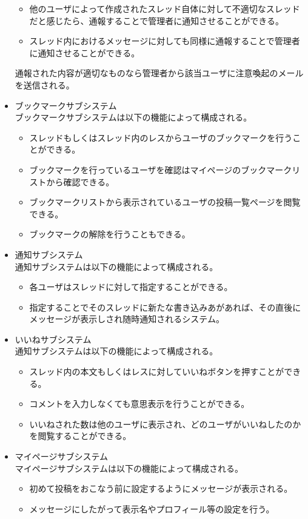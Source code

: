 \documentclass[a4j]{jarticle}
\begin{document}
\begin{itemize}
\begin{itemize}
\item 他のユーザによって作成されたスレッド自体に対して不適切なスレッドだと感じたら、通報することで管理者に通知させることができる。
\item スレッド内におけるメッセージに対しても同様に通報することで管理者に通知させることができる。\\
\end{itemize}
通報された内容が適切なものなら管理者から該当ユーザに注意喚起のメールを送信される。

\item ブックマークサブシステム\\
ブックマークサブシステムは以下の機能によって構成される。
\begin{itemize}
\item スレッドもしくはスレッド内のレスからユーザのブックマークを行うことができる。
\item ブックマークを行っているユーザを確認はマイページのブックマークリストから確認できる。
\item ブックマークリストから表示されているユーザの投稿一覧ページを閲覧できる。
\item ブックマークの解除を行うこともできる。
\end{itemize}

\item 通知サブシステム\\
通知サブシステムは以下の機能によって構成される。
\begin{itemize}
\item 各ユーザはスレッドに対して指定することができる。
\item 指定することでそのスレッドに新たな書き込みあがあれば、その直後にメッセージが表示しされ随時通知されるシステム。
\end{itemize}

\item いいねサブシステム\\
通知サブシステムは以下の機能によって構成される。
\begin{itemize}
\item スレッド内の本文もしくはレスに対していいねボタンを押すことができる。
\item コメントを入力しなくても意思表示を行うことができる。
\item いいねされた数は他のユーザに表示され、どのユーザがいいねしたのかを閲覧することができる。
\end{itemize}

\item マイページサブシステム\\
マイページサブシステムは以下の機能によって構成される。
\begin{itemize}
\item 初めて投稿をおこなう前に設定するようにメッセージが表示される。
\item メッセージにしたがって表示名やプロフィール等の設定を行う。
\end{itemize}
\end{itemize}
\end{document}

